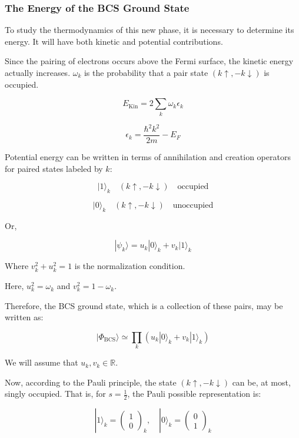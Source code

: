 \documentclass{article}
\begin{document}
\subsubsection{The Energy of the BCS Ground State}

To study the thermodynamics of this new phase, it is necessary to determine its energy. It will have both kinetic and potential contributions.

Since the pairing of electrons occurs above the Fermi surface, the kinetic energy actually increases. \( \omega_k \) is the probability that a pair state \( (k \uparrow, -k \downarrow) \) is occupied.

\[
E_{\text{Kin}} = 2 \sum_k \omega_k \epsilon_k
\]

\[
\epsilon_k = \frac{\hbar^2 k^2}{2m} - E_F \tag{1}
\]

Potential energy can be written in terms of annihilation and creation operators for paired states labeled by \( k \):

\[
|1\rangle_k \quad (k \uparrow, -k \downarrow) \quad \text{occupied}
\]

\[
|0\rangle_k \quad (k \uparrow, -k \downarrow) \quad \text{unoccupied}
\]

Or,

\[
|\psi_k\rangle = u_k |0\rangle_k + v_k |1\rangle_k \tag{2}
\]

Where \( v_k^2 + u_k^2 = 1 \) is the normalization condition.

Here, \( u_k^2 = \omega_k \) and \( v_k^2 = 1 - \omega_k \).

Therefore, the BCS ground state, which is a collection of these pairs, may be written as:

\[
|\Phi_{\text{BCS}}\rangle \simeq \prod_k \left( u_k |0\rangle_k + v_k |1\rangle_k \right) \tag{3}
\]

We will assume that \( u_k, v_k \in \mathbb{R} \).

Now, according to the Pauli principle, the state \( (k \uparrow, -k \downarrow) \) can be, at most, singly occupied. That is, for \( s = \frac{1}{2} \), the Pauli possible representation is:

\[
|1\rangle_k = \begin{pmatrix} 1 \\ 0 \end{pmatrix}_k, \quad |0\rangle_k = \begin{pmatrix} 0 \\ 1 \end{pmatrix}_k
\]
\end{document}
